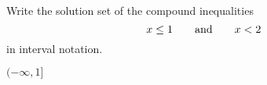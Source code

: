 

Write the solution set of the compound inequalities
\[x\leq 1\text{\quad\quad and\quad\quad}  x <2 \]
in interval notation.

\begin{solution}
$(-\infty, 1]$
\end{solution}